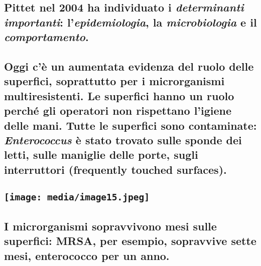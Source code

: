 \documentclass[]{article}
\begin{document}
\subsection{\texorpdfstring{Pittet nel 2004 ha individuato i
\emph{determinanti importanti}: l'\emph{epidemiologia}, la
\emph{microbiologia} e il
\emph{comportamento}.}{Pittet nel 2004 ha individuato i determinanti importanti: l'epidemiologia, la microbiologia e il comportamento.}}\label{pittet-nel-2004-ha-individuato-i-determinanti-importanti-lepidemiologia-la-microbiologia-e-il-comportamento.}

\subsection{\texorpdfstring{Oggi c'è un aumentata evidenza del ruolo
delle superfici, soprattutto per i microrganismi multiresistenti. Le
\textbf{superfici} hanno un ruolo perché gli operatori non rispettano
l'igiene delle mani. Tutte le superfici sono contaminate:
\emph{Enterococcus} è stato trovato sulle sponde dei letti, sulle
maniglie delle porte, sugli interruttori (frequently touched
surfaces).}{Oggi c'è un aumentata evidenza del ruolo delle superfici, soprattutto per i microrganismi multiresistenti. Le superfici hanno un ruolo perché gli operatori non rispettano l'igiene delle mani. Tutte le superfici sono contaminate: Enterococcus è stato trovato sulle sponde dei letti, sulle maniglie delle porte, sugli interruttori (frequently touched surfaces).}}\label{oggi-cuxe8-un-aumentata-evidenza-del-ruolo-delle-superfici-soprattutto-per-i-microrganismi-multiresistenti.-le-superfici-hanno-un-ruolo-perchuxe9-gli-operatori-non-rispettano-ligiene-delle-mani.-tutte-le-superfici-sono-contaminate-enterococcus-uxe8-stato-trovato-sulle-sponde-dei-letti-sulle-maniglie-delle-porte-sugli-interruttori-frequently-touched-surfaces.}

\subsection{\texorpdfstring{\protect\texttt{[image: media/image15.jpeg]}}{}}\label{section-7}

\subsection{I microrganismi sopravvivono mesi sulle superfici: MRSA, per
esempio, sopravvive sette mesi, enterococco per un
anno.}\label{i-microrganismi-sopravvivono-mesi-sulle-superfici-mrsa-per-esempio-sopravvive-sette-mesi-enterococco-per-un-anno.}
\end{document}
